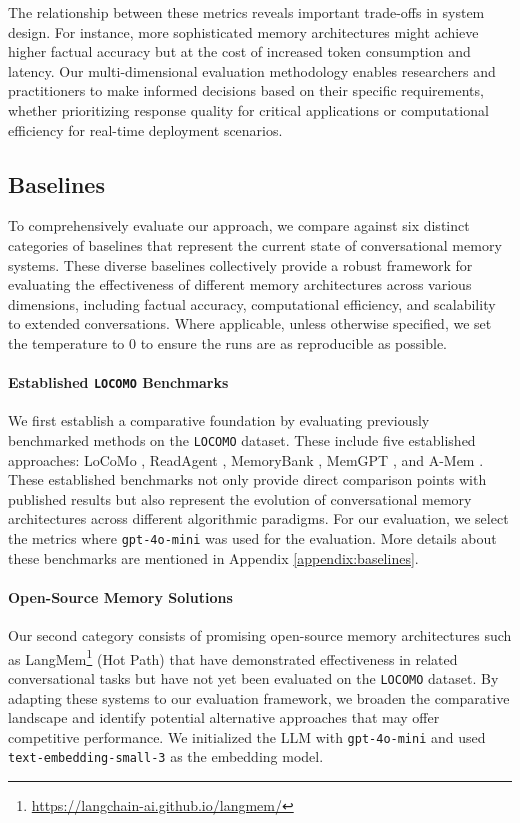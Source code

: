 The relationship between these metrics reveals important trade-offs in system design. For instance, more sophisticated memory architectures might achieve higher factual accuracy but at the cost of increased token consumption and latency. Our multi-dimensional evaluation methodology enables researchers and practitioners to make informed decisions based on their specific requirements, whether prioritizing response quality for critical applications or computational efficiency for real-time deployment scenarios. 

\subsection{Baselines}
To comprehensively evaluate our approach, we compare against six distinct categories of baselines that represent the current state of conversational memory systems. These diverse baselines collectively provide a robust framework for evaluating the effectiveness of different memory architectures across various dimensions, including factual accuracy, computational efficiency, and scalability to extended conversations. Where applicable, unless otherwise specified, we set the temperature to 0 to ensure the runs are as reproducible as possible.

\paragraph{Established \texttt{LOCOMO} Benchmarks}
We first establish a comparative foundation by evaluating previously benchmarked methods on the \texttt{LOCOMO} dataset. These include five established approaches: LoCoMo \citep{maharana2024evaluating}, ReadAgent \citep{lee2024human}, MemoryBank \citep{zhong2024memorybank}, MemGPT \citep{packer2023memgpt}, and A-Mem \citep{xu2025mem}. These established benchmarks not only provide direct comparison points with published results but also represent the evolution of conversational memory architectures across different algorithmic paradigms. For our evaluation, we select the metrics where \texttt{gpt-4o-mini} was used for the evaluation. More details about these benchmarks are mentioned in Appendix \ref{appendix:baselines}.

\paragraph{Open-Source Memory Solutions}
Our second category consists of promising open-source memory architectures such as LangMem\footnote{\url{https://langchain-ai.github.io/langmem/}} (Hot Path) that have demonstrated effectiveness in related conversational tasks but have not yet been evaluated on the \texttt{LOCOMO} dataset. By adapting these systems to our evaluation framework, we broaden the comparative landscape and identify potential alternative approaches that may offer competitive performance. We initialized the LLM with \texttt{gpt-4o-mini} and used \texttt{text-embedding-small-3} as the embedding model.

